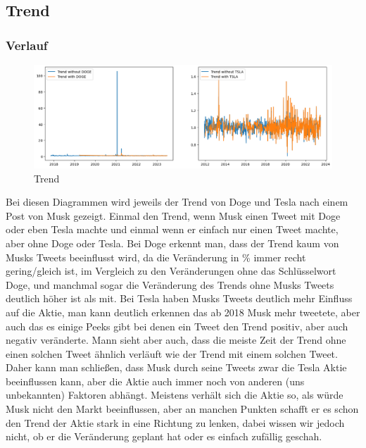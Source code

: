 \documentclass{article}
\begin{document}
\newpage



\subsection{Trend}
\subsubsection{Verlauf}
\begin{figure}[!htb]
  	\includegraphics[width=\textwidth, center]{../imgs/Trend.png}
 	\caption{Trend}
 	\label{fig:Trend}
\end{figure}
Bei diesen Diagrammen wird jeweils der Trend von Doge und Tesla nach einem Post von Musk gezeigt. Einmal den Trend, wenn Musk einen Tweet mit Doge oder eben Tesla machte und einmal wenn er einfach nur einen Tweet machte, aber ohne Doge oder Tesla. Bei Doge erkennt man, dass der Trend kaum von Musks Tweets beeinflusst wird, da die Veränderung in \% immer recht gering/gleich ist, im Vergleich zu den Veränderungen ohne das
Schlüsselwort Doge, und manchmal sogar die Veränderung des Trends ohne Musks Tweets deutlich höher ist als mit. Bei Tesla haben Musks Tweets deutlich mehr Einfluss auf die Aktie, man kann deutlich erkennen das ab 2018 Musk mehr tweetete, aber auch das es einige Peeks gibt bei denen ein Tweet den Trend positiv, aber auch negativ veränderte. Mann sieht aber auch, dass die meiste Zeit der Trend ohne einen solchen Tweet ähnlich verläuft wie der Trend mit einem solchen Tweet. Daher kann man schließen, dass Musk durch seine Tweets zwar die Tesla Aktie beeinflussen kann, aber die Aktie auch immer noch von anderen (uns unbekannten) Faktoren abhängt. Meistens verhält sich die Aktie so, als würde Musk nicht den Markt beeinflussen, aber an manchen Punkten schafft er es schon den Trend der Aktie stark in eine Richtung zu lenken, dabei wissen wir jedoch nicht, ob er die Veränderung geplant hat oder es einfach zufällig geschah.
\end{document}
